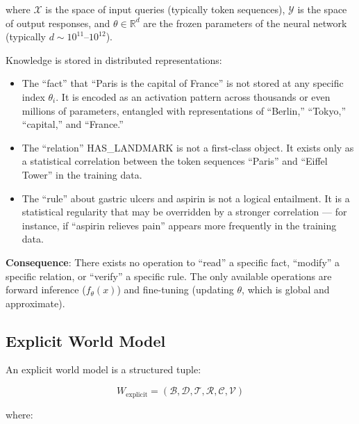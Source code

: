 \documentclass[11pt,a4paper]{article}
\begin{document}
where \(\mathcal{X}\) is the space of input queries (typically token
sequences), \(\mathcal{Y}\) is the space of output responses, and
\(\theta \in \mathbb{R}^d\) are the frozen parameters of the neural
network (typically \(d \sim 10^{11}\)--\(10^{12}\)).

Knowledge is stored in distributed representations:

\begin{itemize}
\tightlist
\item
  The ``fact'' that ``Paris is the capital of France'' is not stored at
  any specific index \(\theta_i\). It is encoded as an activation
  pattern across thousands or even millions of parameters, entangled
  with representations of ``Berlin,'' ``Tokyo,'' ``capital,'' and
  ``France.''
\item
  The ``relation'' HAS\_LANDMARK is not a first-class object. It exists
  only as a statistical correlation between the token sequences
  ``Paris'' and ``Eiffel Tower'' in the training data.
\item
  The ``rule'' about gastric ulcers and aspirin is not a logical
  entailment. It is a statistical regularity that may be overridden by a
  stronger correlation --- for instance, if ``aspirin relieves pain''
  appears more frequently in the training data.
\end{itemize}

\textbf{Consequence}: There exists no operation to ``read'' a specific
fact, ``modify'' a specific relation, or ``verify'' a specific rule. The
only available operations are forward inference (\(f_\theta(x)\)) and
fine-tuning (updating \(\theta\), which is global and approximate).

\subsection{Explicit World Model}\label{explicit-world-model}

An explicit world model is a structured tuple:

\[W_{\text{explicit}} = (\mathcal{B}, \mathcal{D}, \mathcal{T}, \mathcal{R}, \mathcal{C}, \mathcal{V})\]

where:
\end{document}
